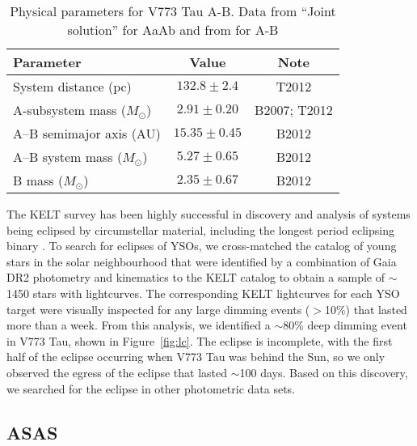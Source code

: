 \documentclass{aa}
\begin{document}
\begin{table}
\caption{Physical parameters for V773 Tau A-B. Data from \citet{Torres12} ``Joint solution'' for AaAb and from \citet{Boden12} for A-B}              %
\label{tab:physparams}      %
\centering                                      %
\begin{tabular}{l c c}          %
\hline\hline                        %
Parameter & Value & Note \\
\hline                  %
System distance (pc)        & $132.8 \pm 2.4$     & T2012 \\
A-subsystem mass ($M_\odot$)& $2.91 \pm 0.20$     & B2007; T2012 \\
A–B semimajor axis (AU)     & $15.35 \pm 0.45$    & B2012 \\
A–B system mass ($M_\odot$) & $5.27 \pm 0.65$     & B2012 \\
B mass ($M_\odot$)          & $2.35 \pm 0.67$     & B2012 \\
\hline                                             %
\end{tabular}
\end{table}

The KELT survey has been highly successful in discovery and analysis of systems being eclipsed by circumstellar material, including the longest period eclipsing binary \citep{Rodriguez:2016}.
%
To search for eclipses of YSOs, we cross-matched the \citet{Zari2018} catalog of young stars in the solar neighbourhood that were identified by a combination of Gaia DR2 \citep{GaiaDR2} photometry and kinematics to the KELT catalog to obtain a sample of $\sim$1450 stars with lightcurves.
%
The corresponding KELT lightcurves for each YSO target were visually inspected for any large dimming events ($>$10\%) that lasted more than a week.
%
From this analysis, we identified a $\sim$80\% deep dimming event in V773 Tau, shown in Figure~\ref{fig:lc}.
%
The eclipse is incomplete, with the first half of the eclipse occurring when V773 Tau was behind the Sun, so we only observed the egress of the eclipse that lasted $\sim$100 days.
%
Based on this discovery, we searched for the eclipse in other photometric data sets.

\subsection{ASAS}
\end{document}
